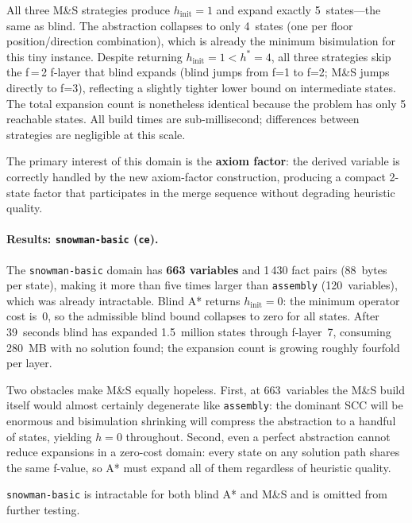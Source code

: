 \documentclass[11pt,a4paper]{article}
\begin{document}
All three M\&S strategies produce $h_{\mathrm{init}} = 1$ and expand exactly
5~states---the same as blind.
The abstraction collapses to only 4~states (one per floor position/direction
combination), which is already the minimum bisimulation for this tiny instance.
Despite returning $h_{\mathrm{init}} = 1 < h^* = 4$, all three strategies
skip the f\,=\,2 f-layer that blind expands (blind jumps from f=1 to f=2;
M\&S jumps directly to f=3), reflecting a slightly tighter lower bound on
intermediate states.
The total expansion count is nonetheless identical because the problem has
only 5 reachable states.
All build times are sub-millisecond; differences between strategies are
negligible at this scale.

The primary interest of this domain is the \textbf{axiom factor}: the derived
variable is correctly handled by the new axiom-factor construction, producing
a compact 2-state factor that participates in the merge sequence without
degrading heuristic quality.

\paragraph{Results: \texttt{snowman-basic} (\texttt{ce}).}

The \texttt{snowman-basic} domain has \textbf{663 variables} and 1\,430 fact
pairs (88~bytes per state), making it more than five times larger than
\texttt{assembly} (120~variables), which was already intractable.
Blind A* returns $h_{\mathrm{init}} = 0$: the minimum operator cost is~0, so
the admissible blind bound collapses to zero for all states.
After 39~seconds blind has expanded 1.5~million states through f-layer~7,
consuming 280~MB with no solution found; the expansion count is growing
roughly fourfold per layer.

Two obstacles make M\&S equally hopeless.
First, at 663~variables the M\&S build itself would almost certainly
degenerate like \texttt{assembly}: the dominant SCC will be enormous and
bisimulation shrinking will compress the abstraction to a handful of states,
yielding $h = 0$ throughout.
Second, even a perfect abstraction cannot reduce expansions in a zero-cost
domain: every state on any solution path shares the same f-value, so A*
must expand all of them regardless of heuristic quality.

\texttt{snowman-basic} is intractable for both blind A* and M\&S and is
omitted from further testing.
\end{document}
